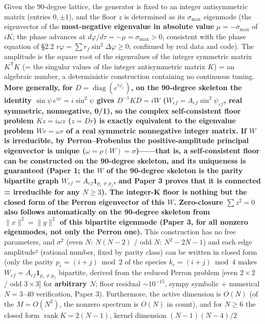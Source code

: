 \documentclass[
  a4paper,
]{ltjsarticle}
\begin{document}
Given the 90-degree lattice, the generator is fixed to an integer
antisymmetric matrix (entries \(0,\pm1\)), and the floor \(z\) is
determined as its \(\sigma_{\max}\) eigenmode (the eigenvector of the
\textbf{most-negative eigenvalue in absolute value}
\(\mu=-\sigma_{\max}\) of \(iK\); the phase advances at
\(d\varphi/d\tau=-\mu=\sigma_{\max}>0\), consistent with the phase
equation of §2.2 \(r\dot\varphi=\sum r_f\sin^2\Delta\varphi\ge0\);
confirmed by real data and code). The amplitude is the square root of
the eigenvalues of the integer symmetric matrix \(K^{\mathsf T}K\) (=
the singular values of the integer antisymmetric matrix \(K\)) = an
algebraic number, a deterministic construction containing no continuous
tuning. \textbf{More generally, for
\(D=\operatorname{diag}(e^{i\varphi_e})\), on the 90-degree skeleton the
identity \(\sin\psi\,e^{i\psi}=i\sin^2\psi\) gives \(D^{-1}KD=iW\)
(\(W_{ef}=A_{ef}\sin^2\psi_{ef}\), real symmetric, nonnegative, 0/1), so
the complex self-consistent floor problem \(Kz=i\omega z\) (\(z=Dr\)) is
exactly equivalent to the eigenvalue problem \(Wr=\omega r\) of a real
symmetric nonnegative integer matrix. If \(W\) is irreducible, by
Perron--Frobenius the positive-amplitude principal eigenvector is unique
(\(\omega=\rho(W)=\sigma\))------that is, a self-consistent floor can be
constructed on the 90-degree skeleton, and its uniqueness is guaranteed
(Paper 1; the \(W\) of the 90-degree skeleton is the parity bipartite
graph \(W_{ef}=A_{ef}\mathbf 1_{p_e\neq p_f}\), and Paper 3 proves that
it is connected = irreducible for any \(N\ge3\)). The integer-K floor is
nothing but the closed form of the Perron eigenvector of this \(W\).
Zero-closure \(\sum z^2=0\) also follows automatically on the 90-degree
skeleton from \(\|x\|^2=\|y\|^2\) of this bipartite eigenmode (Paper 3,
for all nonzero eigenmodes, not only the Perron one).} This construction
has no free parameters, and \(\sigma^2\) (even \(N\): \(N(N-2)\) / odd
\(N\): \(N^2-2N-1\)) and each edge amplitude² (rational number, fixed by
parity class) can be written in closed form (only the parity
\(p_e=(i+j)\bmod2\) of the species \(k_e=(i+j)\bmod4\) makes
\(W_{ef}=A_{ef}\mathbf 1_{p_e\neq p_f}\) bipartite, derived from the
reduced Perron problem {[}even \(2\times2\) / odd \(3\times3\){]} for
\textbf{arbitrary \(N\)}; floor residual \(\sim10^{-15}\), sympy
symbolic + numerical \(N=3\)--\(40\) verification, Paper 3).
Furthermore, the active dimension is \(O(N)\) (of the \(M=O(N^2)\), the
nonzero spectrum is \(O(N)\) in count), and for \(N\ge6\) the closed
form \(\operatorname{rank}K=2(N-1)\), kernel dimension \((N-1)(N-4)/2\)
\end{document}

